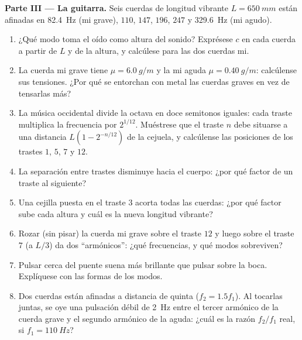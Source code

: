 \begin{problem}
\medskip
\noindent\textbf{Parte III --- La guitarra.}
Seis cuerdas de longitud vibrante $L = \qty{650}{mm}$ están afinadas en
\qty{82.4}{Hz} (mi grave), $110$, $147$, $196$, $247$ y \qty{329.6}{Hz}
(mi agudo).
\begin{enumerate}[resume]
  \item ¿Qué modo toma el oído como altura del sonido? Exprésese $c$ en
        cada cuerda a partir de $L$ y de la altura, y calcúlese para las
        dos cuerdas mi.
  \item La cuerda mi grave tiene $\mu = \qty{6.0}{g/m}$ y la mi aguda
        $\mu = \qty{0.40}{g/m}$: calcúlense sus tensiones. ¿Por qué se
        entorchan con metal las cuerdas graves en vez de tensarlas más?
  \item La música occidental divide la octava en doce semitonos iguales:
        cada traste multiplica la frecuencia por $2^{1/12}$. Muéstrese que
        el traste $n$ debe situarse a una distancia $L(1 - 2^{-n/12})$ de
        la cejuela, y calcúlense las posiciones de los trastes $1$, $5$,
        $7$ y $12$.
  \item La separación entre trastes disminuye hacia el cuerpo: ¿por qué
        factor de un traste al siguiente?
  \item Una cejilla puesta en el traste $3$ acorta todas las cuerdas: ¿por
        qué factor sube cada altura y cuál es la nueva longitud vibrante?
  \item Rozar (sin pisar) la cuerda mi grave sobre el traste $12$ y luego
        sobre el traste $7$ (a $L/3$) da dos ``armónicos'': ¿qué
        frecuencias, y qué modos sobreviven?
  \item Pulsar cerca del puente suena más brillante que pulsar sobre la
        boca. Explíquese con las formas de los modos.
  \item Dos cuerdas están afinadas a distancia de quinta ($f_2 = 1.5f_1$).
        Al tocarlas juntas, se oye una pulsación débil de \qty{2}{Hz}
        entre el tercer armónico de la cuerda grave y el segundo armónico
        de la aguda: ¿cuál es la razón $f_2/f_1$ real, si
        $f_1 = \qty{110}{Hz}$?
\end{enumerate}


\end{problem}
